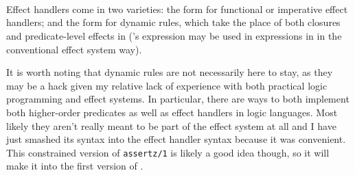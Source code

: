 \begin{bnf*}
     \\
     \\
     \\
     \\
     \\
     \\
     \\
     \\
\end{bnf*}

Effect handlers come in two varieties: the  form for functional
or imperative effect handlers; and the  form for dynamic rules,
which take the place of both closures and predicate-level effects in \Law{}
(\Poetry{}'s  expression may be used in expressions in \Law{}
in the conventional effect system way).

It is worth noting that dynamic rules are not necessarily here to stay, as
they may be a hack given my relative lack of experience with both practical
logic programming and effect systems. In particular, there are ways to both
implement both higher-order predicates\cite{hologic} as well as effect
handlers in logic languages\cite{prologeffects}. Most likely they aren't really
meant to be part of the effect system at all and I have just smashed its syntax
into the effect handler syntax because it was convenient. This constrained
version of \texttt{assertz/1} is likely a good idea though, so it will make
it into the first version of \Trilogy{}.

